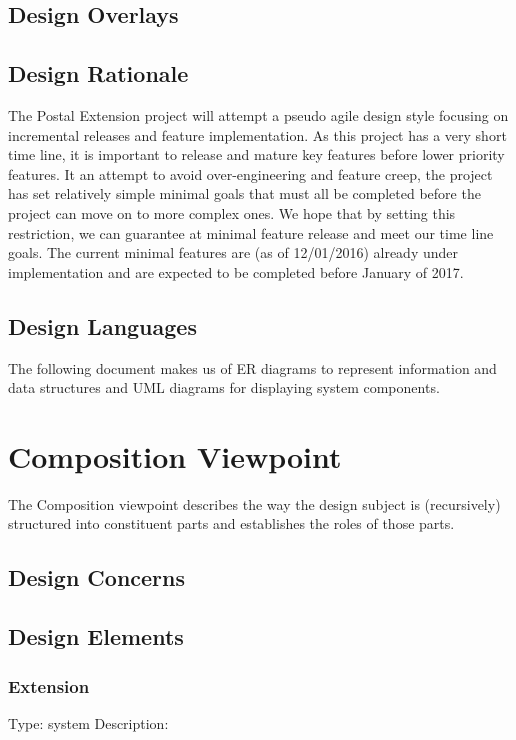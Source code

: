 \documentclass[letterpaper,10pt,titlepage,draftclsnofoot,onecolumn,onesided] {IEEEtran}
\begin{document}
\subsection{Design Overlays}

\subsection{Design Rationale}
The Postal Extension project will attempt a pseudo agile design style focusing on incremental releases and feature implementation.
As this project has a very short time line, it is important to release and mature key features before lower priority features. 
It an attempt to avoid over-engineering and feature creep, the project has set relatively simple minimal goals that must all be completed before the project can move on to more complex ones.
We hope that by setting this restriction, we can guarantee at minimal feature release and meet our time line goals.
The current minimal features are (as of 12/01/2016) already under implementation and are expected to be completed before January of 2017.


\subsection{Design Languages}
The following document makes us of ER diagrams to represent information and data structures and UML diagrams for displaying system components. 






\section{Composition Viewpoint}
The Composition viewpoint describes the way the design subject is (recursively) structured into constituent
parts and establishes the roles of those parts. 
\subsection{Design Concerns}
\subsection{Design Elements}

	\subsubsection{Extension}
	Type: system
	Description:
	
\end{document}
